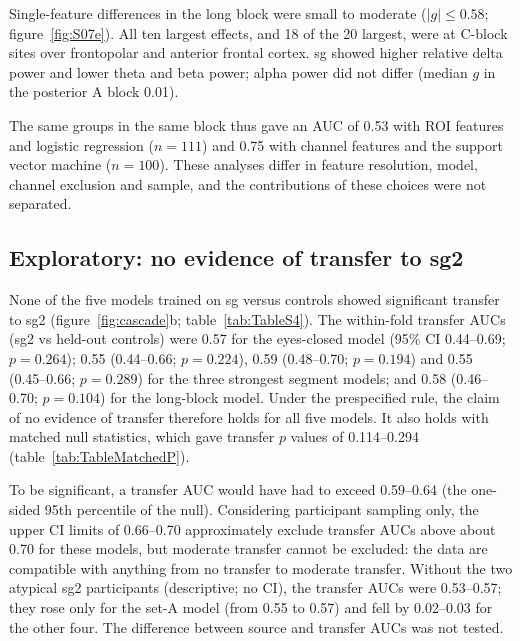 Single-feature differences in the long block were small to moderate ($|g| \le 0.58$; figure~\ref{fig:S07e}). All ten largest effects, and 18 of the 20 largest, were at C-block sites over frontopolar and anterior frontal cortex. sg showed higher relative delta power and lower theta and beta power; alpha power did not differ (median $g$ in the posterior A block 0.01).

The same groups in the same block thus gave an AUC of 0.53 with ROI features and logistic regression ($n = 111$) and 0.75 with channel features and the support vector machine ($n = 100$). These analyses differ in feature resolution, model, channel exclusion and sample, and the contributions of these choices were not separated.

\subsection{Exploratory: no evidence of transfer to sg2}
\label{sec:res-transfer}

None of the five models trained on sg versus controls showed significant transfer to sg2 (figure~\ref{fig:cascade}b; table~\ref{tab:TableS4}). The within-fold transfer AUCs (sg2 vs held-out controls) were 0.57 for the eyes-closed model (95\% CI 0.44--0.69; $p = 0.264$); 0.55 (0.44--0.66; $p = 0.224$), 0.59 (0.48--0.70; $p = 0.194$) and 0.55 (0.45--0.66; $p = 0.289$) for the three strongest segment models; and 0.58 (0.46--0.70; $p = 0.104$) for the long-block model. Under the prespecified rule, the claim of no evidence of transfer therefore holds for all five models. It also holds with matched null statistics, which gave transfer $p$ values of 0.114--0.294 (table~\ref{tab:TableMatchedP}).

To be significant, a transfer AUC would have had to exceed 0.59--0.64 (the one-sided 95th percentile of the null). Considering participant sampling only, the upper CI limits of 0.66--0.70 approximately exclude transfer AUCs above about 0.70 for these models, but moderate transfer cannot be excluded: the data are compatible with anything from no transfer to moderate transfer. Without the two atypical sg2 participants (descriptive; no CI), the transfer AUCs were 0.53--0.57; they rose only for the set-A model (from 0.55 to 0.57) and fell by 0.02--0.03 for the other four. The difference between source and transfer AUCs was not tested.
